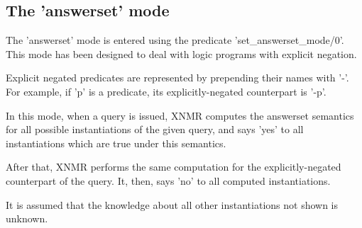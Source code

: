 \documentclass{article}
\begin{document}
\subsection{The 'answerset' mode}

The 'answerset' mode is entered using the predicate
'set_answerset_mode/0'. This mode has been designed to deal with logic
programs with explicit negation.

Explicit negated predicates are represented by prepending their names
with '-'. For example, if 'p' is a predicate, its explicitly-negated
counterpart is '-p'. 

In this mode, when a query is issued, XNMR computes the answerset
semantics for all possible instantiations of the given query, and says
'yes' to all instantiations which are true under this semantics. 

After that, XNMR performs the same computation for the
explicitly-negated counterpart of the query. It, then, says 'no' to
all computed instantiations. 

It is assumed that the knowledge about all other instantiations not
shown is unknown.
\end{document}
